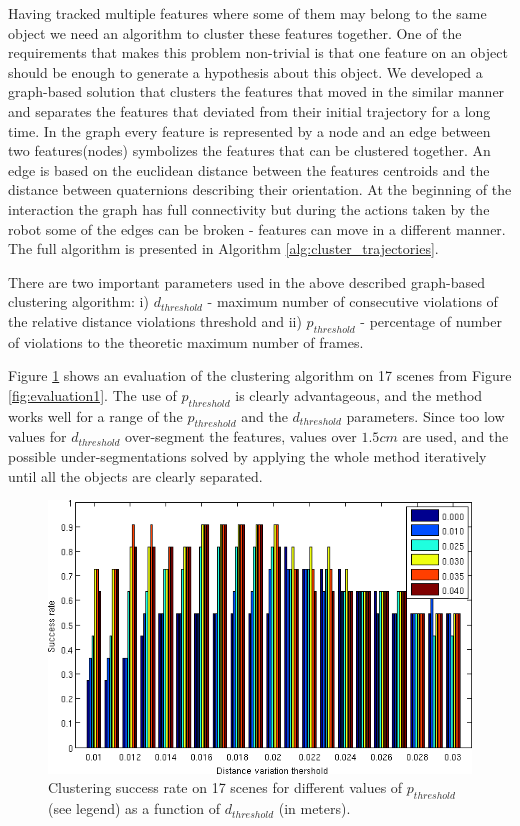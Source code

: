 Having tracked multiple features where some of them may belong to the same object we need an algorithm to cluster these features together. One of the requirements that makes this problem non-trivial is that one feature on an object should be enough to generate a hypothesis about this object. We developed a graph-based solution that clusters the features that moved in the similar manner and separates the features that deviated from their initial trajectory for a long time. In the graph every feature is represented by a node and an edge between two features(nodes) symbolizes the features that can be clustered together. An edge is based on the euclidean distance between the features centroids and the distance between quaternions describing their orientation. At the beginning of the interaction the graph has full connectivity but during the actions taken by the robot some of the edges can be broken - features can move in a different manner.
The full algorithm is presented in Algorithm \ref{alg:cluster_trajectories}.

There are two important parameters used in the above described graph-based clustering algorithm: i) $d_{threshold}$ - maximum number of consecutive violations of the relative distance violations threshold and ii) $p_{threshold}$ - percentage of number of violations to the theoretic maximum number of frames.


 Figure \ref{fig:clustering} 
shows an evaluation of the clustering algorithm on 17 scenes from Figure \ref{fig:evaluation1}.
 The use of $p_{threshold}$ is clearly advantageous, and the method works well for a range of the $p_{threshold}$ and the $d_{threshold}$ parameters. 
 Since too low values for $d_{threshold}$ over-segment the features, values over $1.5cm$ are used, and the possible under-segmentations solved
 by applying the whole method iteratively until all the objects are clearly separated.
 

\begin{figure}[tb!]
   \begin{center}
     \includegraphics[width=.9\columnwidth]{figures/distribution.png}
		\vspace{-2ex}
   \caption{Clustering success rate on 17 scenes for different values of $p_{threshold}$ (see legend) as a function of $d_{threshold}$ (in meters).}
   \label{fig:clustering}
 \end{center}
 \end{figure}


